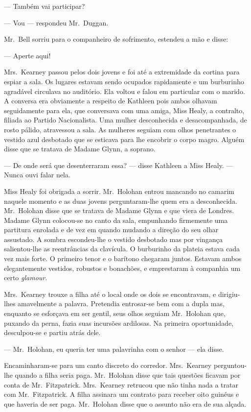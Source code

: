 --- Também vai participar?

--- Vou --- respondeu Mr.~Duggan.

Mr.~Bell sorriu para o companheiro de sofrimento, estendeu a mão e disse:

--- Aperte aqui!

Mrs.~Kearney passou pelos dois jovens e foi até a extremidade da cortina para
espiar a sala.  Os lugares estavam sendo ocupados rapidamente e um burburinho
agradável circulava no auditório.  Ela voltou e falou em particular com o
marido.  A conversa era obviamente a respeito de Kathleen pois ambos olhavam
seguidamente para ela, que conversava com uma amiga, Miss Healy, a contralto,
filiada ao Partido Nacionalista.  Uma mulher desconhecida e desacompanhada, de
rosto pálido, atravessou a sala.  As mulheres seguiam com olhos penetrantes o
vestido azul desbotado que se esticava para lhe encobrir o corpo magro.  Alguém
disse que se tratava de Madame Glynn, a soprano.

--- De onde será que desenterraram essa? --- disse Kathleen a Miss Healy.  ---
Nunca ouvi falar nela.

Miss Healy foi obrigada a sorrir.  Mr.~Holohan entrou mancando no camarim
naquele momento e as duas jovens perguntaram-lhe quem era a desconhecida.  
Mr.~Holohan disse que se tratava de Madame Glynn e que viera de Londres.  Madame
Glynn colocou-se no canto da sala, empunhando firmemente uma partitura enrolada
e de vez em quando mudando a direção do seu olhar assustado.  A sombra
escondeu-lhe o vestido desbotado mas por vingança salientou-lhe as reentrâncias
da clavícula.  O burburinho da plateia estava cada vez mais forte.  O primeiro
tenor e o barítono chegaram juntos.  Estavam ambos elegantemente vestidos,
robustos e bonachões, e emprestaram à companhia um certo \textit{glamour}.

Mrs.~Kearney trouxe a filha até o local onde os dois se encontravam, e
dirigiu-lhes amavelmente a palavra.  Pretendia entrosar-se bem com a dupla mas,
enquanto se esforçava em ser gentil, seus olhos seguiam Mr.~Holohan que,
puxando da perna, fazia suas incursões ardilosas.  Na primeira oportunidade,
desculpou-se e partiu atrás dele.

--- Mr.~Holohan, eu queria ter uma palavrinha com o senhor --- ela disse.

Encaminharam-se para um canto discreto do corredor.  Mrs.~Kearney perguntou-lhe
quando a filha seria paga.  Mr.~Holohan disse que tais questões ficavam por
conta de Mr.~Fitzpatrick.  Mrs.~Kearney retrucou que não tinha nada a tratar
com Mr.~Fitzpatrick.  A filha assinara um contrato para receber oito guinéus e
que haveria de ser paga.  Mr.~Holohan disse que o assunto não era de sua
alçada.


